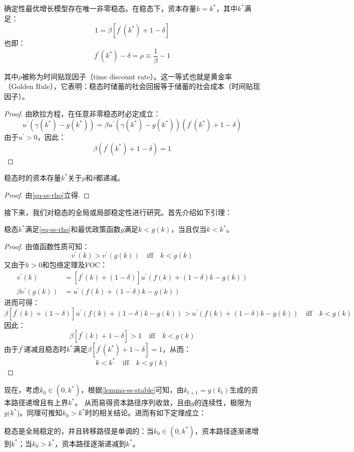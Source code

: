 \begin{theorem}    \label{th-ss-exist}
    确定性最优增长模型存在唯一非零稳态。在稳态下，资本存量$k=k^*$，其中$k^*$满足：
    $$1=\beta\left[f^{\prime}\left(k^*\right)+1-\delta\right]$$
    也即：
    \begin{equation} \label{eq-ss-rho}
        f^{\prime}\left(k^*\right)-\delta = \rho \equiv \frac{1}{\beta}-1
    \end{equation}
\end{theorem}
其中$\rho$被称为时间贴现因子（time discount rate）。这一等式也就是黄金率（Golden Rule），它表明：稳态时储蓄的社会回报等于储蓄的社会成本（时间贴现因子）。
\begin{proof}
    由欧拉方程，在任意非零稳态时必定成立：
    \begin{equation*}
        u^{\prime}\left(\gamma\left(k^*\right)-g\left(k^*\right)\right)
            = \beta u^{\prime}\left(\gamma\left(k^*\right)-g\left(k^*\right)\right)\left(f^{\prime}\left(k^*\right)+1-\delta\right)
    \end{equation*}
    由于$u^{\prime}>0$，因此：
    \begin{equation*}
        \beta\left(f^{\prime}\left(k^*\right)+1-\delta\right) = 1
    \end{equation*}
\end{proof}

\begin{property}
    稳态时的资本存量$k^*$关于$\rho$和$\delta$都递减。
\end{property}
\begin{proof}
    由\cref{eq-ss-rho}立得.
\end{proof}

接下来，我们对稳态的全局或局部稳定性进行研究。首先介绍如下引理：
\begin{lemma}   \label{lemma-ss-stable}
    稳态$k^*$满足\cref{eq-ss-rho}和最优政策函数$g$满足$k<g(k)$，当且仅当$k<k^*$。
\end{lemma}
\begin{proof}
    由值函数性质可知：
    $$v^{\prime}(k)>v^{\prime}\left(g\left(k\right)\right) \quad \text{iff} \quad k < g(k)$$
    又由于$k>0$和包络定理及FOC：
    $$
    \begin{aligned}
        v^{\prime}(k) & =\left[f^{\prime}(k)+(1-\delta)\right] u^{\prime}(f(k)+(1-\delta) k-g(k)) \\
            \beta v^{\prime}(g(k)) & =u^{\prime}(f(k)+(1-\delta) k-g(k))
    \end{aligned}
    $$
    进而可得：
    $$
    \beta\left[f^{\prime}(k)+(1-\delta)\right] u^{\prime}(f(k)+(1-\delta) k-g(k)) 
        >u^{\prime}(f(k)+(1-\delta) k-g(k)) \quad \text{iff} \quad k<g(k)
    $$
    因此：
    $$\beta\left[f^{\prime}\left(k\right)+1-\delta\right]>1 \quad \text{iff} \quad k<g(k)$$
    由于$f^{\prime}$递减且稳态时$k^*$满足$\beta\left[f^{\prime}\left(k^*\right)+1-\delta\right]=1$，从而：
    $$k < k^* \quad \text{iff} \quad k<g(k)$$
\end{proof}

现在，考虑$k_0\in (0, k^*)$，根据\cref{lemma-ss-stable}可知，由$k_{t+1}=g(k_t)$生成的资本路径递增且有上界$k^*$。
从而易得资本路径序列收敛，且由$g$的连续性，极限为$g(k^*$)。同理可推知$k_0>k^*$时的相关结论。进而有如下定理成立：
\begin{theorem}[稳态的稳定性]
    稳态是全局稳定的，并且转移路径是单调的：当$k_0\in (0, k^*)$，资本路径逐渐递增到$k^*$；当$k_0>k^*$，资本路径逐渐递减到$k^*$。
\end{theorem}